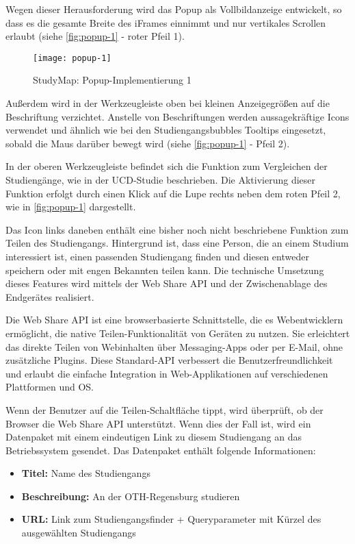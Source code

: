 Wegen dieser Herausforderung wird das Popup als Vollbildanzeige entwickelt, so dass es die gesamte Breite des iFrames einnimmt und nur vertikales Scrollen erlaubt (siehe \autoref{fig:popup-1} - roter Pfeil 1).

\begin{figure}[H]
    \centering
    \texttt{[image: popup-1]}
    \caption{StudyMap: Popup-Implementierung 1}
    \label{fig:popup-1}
\end{figure}

Außerdem wird in der Werkzeugleiste oben bei kleinen Anzeigegrößen auf die Beschriftung verzichtet. Anstelle von Beschriftungen werden aussagekräftige Icons verwendet und ähnlich wie bei den Studiengangsbubbles Tooltips eingesetzt, sobald die Maus darüber bewegt wird (siehe \autoref{fig:popup-1} - Pfeil 2).

In der oberen Werkzeugleiste befindet sich die Funktion zum Vergleichen der Studiengänge, wie in der UCD-Studie beschrieben. Die Aktivierung dieser Funktion erfolgt durch einen Klick auf die Lupe rechts neben dem roten Pfeil 2, wie in \autoref{fig:popup-1} dargestellt.

Das Icon links daneben enthält eine bisher noch nicht beschriebene Funktion zum Teilen des Studiengangs. Hintergrund ist, dass eine Person, die an einem Studium interessiert ist, einen passenden Studiengang finden und diesen entweder speichern oder mit engen Bekannten teilen kann. Die technische Umsetzung dieses Features wird mittels der Web Share API und der Zwischenablage des Endgerätes realisiert.

Die Web Share API ist eine browserbasierte Schnittstelle, die es Webentwicklern ermöglicht, die native Teilen-Funktionalität von Geräten zu nutzen. Sie erleichtert das direkte Teilen von Webinhalten über Messaging-Apps oder per E-Mail, ohne zusätzliche Plugins. Diese Standard-API verbessert die Benutzerfreundlichkeit und erlaubt die einfache Integration in Web-Applikationen auf verschiedenen Plattformen und OS. \parencite{mozilla_corporation_web_2023}

Wenn der Benutzer auf die Teilen-Schaltfläche tippt, wird überprüft, ob der Browser die Web Share API unterstützt. Wenn dies der Fall ist, wird ein Datenpaket mit einem eindeutigen Link zu diesem Studiengang an das Betriebssystem gesendet. Das Datenpaket enthält folgende Informationen:
\begin{itemize}
    \item \textbf{Titel:} Name des Studiengangs
    \item \textbf{Beschreibung:} \glqq An der OTH-Regensburg studieren\grqq{}
    \item \textbf{URL:} Link zum Studiengangsfinder + Queryparameter mit Kürzel des ausgewählten Studiengangs
\end{itemize}

